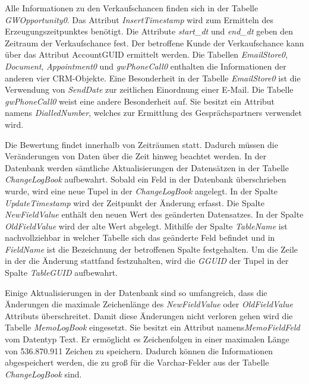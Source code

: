 Alle Informationen zu den Verkaufschancen finden sich in der Tabelle \textit{GWOpportunity0}. Das Attribut \textit{InsertTimestamp} wird zum Ermitteln des Erzeugungszeitpunktes benötigt. Die Attribute \textit{start\_dt} und \textit{end\_dt} geben den Zeitraum der Verkaufschance fest. Der betroffene Kunde der Verkaufschance kann über das Attribut AccountGUID ermittelt werden. Die Tabellen \textit{EmailStore0}, \textit{Document}, \textit{Appointment0} und \textit{gwPhoneCall0} enthalten die  Informationen der anderen vier CRM-Objekte. Eine Besonderheit in der  Tabelle \textit{EmailStore0} ist die Verwendung von \textit{SendDate} zur zeitlichen Einordnung einer E-Mail. Die Tabelle \textit{gwPhoneCall0} weist eine andere Besonderheit auf. Sie besitzt ein Attribut namens \textit{DialledNumber}, welches  zur Ermittlung des Gesprächspartners verwendet wird.  

Die Bewertung findet innerhalb von Zeiträumen statt. Dadurch müssen die Veränderungen von Daten über die Zeit hinweg beachtet werden. In der Datenbank werden sämtliche Aktualisierungen  der Datensätzen in der Tabelle \textit{ChangeLogBook} aufbewahrt. Sobald ein Feld in der Datenbank überschrieben wurde, wird eine neue Tupel in der \textit{ChangeLogBook} angelegt. In der Spalte \textit{UpdateTimestamp} wird der Zeitpunkt der Änderung erfasst. Die Spalte \textit{NewFieldValue} enthält den neuen Wert des geänderten Datensatzes. In der Spalte \textit{OldFieldValue} wird der alte Wert abgelegt. Mithilfe der Spalte \textit{TableName} ist nachvollziehbar in welcher Tabelle sich das geänderte Feld befindet und in \textit{FieldName} ist die Bezeichnung der betroffenen Spalte festgehalten. Um die Zeile in der die Änderung stattfand festzuhalten, wird die \textit{GGUID} der Tupel in der Spalte \textit{TableGUID} aufbewahrt. 

Einige Aktualisierungen in der Datenbank sind so umfangreich, dass die Änderungen die maximale Zeichenlänge des \textit{NewFieldValue} oder \textit{OldFieldValue} Attributs überschreitet. Damit diese Änderungen nicht verloren gehen wird die Tabelle \textit{MemoLogBook} eingesetzt. Sie besitzt ein Attribut namens\textit{MemoFieldFeld} vom Datentyp Text. Er ermöglicht es Zeichenfolgen in einer maximalen Länge von 536.870.911 Zeichen zu speichern. Dadurch können die Informationen abgespeichert werden, die zu groß für die Varchar-Felder aus der Tabelle \textit{ChangeLogBook} sind.     

